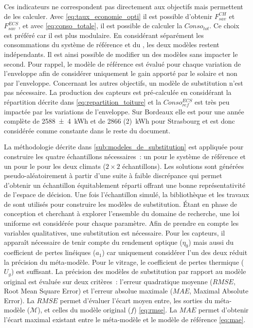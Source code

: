 Ces indicateurs ne correspondent pas directement aux objectifs mais permettent de les calculer.
Avec \eqref{eq:taux_economie_opti} il est possible d’obtenir $F_{sav}^{CH}$ et $F_{sav}^{ECS}$,
et avec \eqref{eq:conso_totale}, il est possible de calculer la $Conso_{tot}$.
Ce choix est préféré car il est plus modulaire. En considérant séparément les consommations
du système de référence et du , les deux modèles restent indépendants. Il est
ainsi possible de modifier un des modèles sans impacter le second. Pour rappel, le
modèle de référence est évalué pour chaque variation de l’enveloppe afin de considérer
uniquement le gain apporté par le solaire et non par l’enveloppe.
Concernant les autres objectifs, un modèle de substitution n’est pas nécessaire. La
production des capteurs  est pré-calculée en considérant la répartition décrite
dans \eqref{eq:repartition_toiture} et la $Conso_{ref}^{ECS}$ est très peu impactée par
les variations de l’enveloppe. Sur Bordeaux elle est pour une année complète de \SI{2588(4)}{kWh}
et de \SI{2866 (2)}{kWh} pour Strasbourg et est donc considérée comme constante
dans le reste du document.

La méthodologie décrite dans \ref{sub:modeles_de_substitution} est appliquée pour
construire les quatre échantillons nécessaires~: un pour le système de référence et un pour
le  pour les deux climats ($2 \times 2$ échantillons). Les solutions sont
générées pseudo-aléatoirement à partir d’une suite à faible discrépance qui permet
d’obtenir un échantillon équitablement réparti offrant une bonne représentativité de
l’espace de décision. Une fois l’échantillon simulé, la bibliothèque
 et les travaux de \textcite{Merheb2013}
sont utilisés pour construire les modèles de substitution. Étant en phase de conception
et cherchant à explorer l’ensemble du domaine de recherche, une loi uniforme est
considérée pour chaque paramètre. Afin de prendre en compte les variables qualitatives,
une substitution est nécessaire. Pour les capteurs, il apparaît nécessaire de tenir compte
du rendement optique ($\eta_{0}$) mais aussi du coefficient de pertes linéiques ($a_{1}$)
car uniquement considérer l’un des deux réduit la précision du méta-modèle. Pour le
vitrage, le coefficient de pertes thermique ($U_{g}$) est suffisant. La précision des
modèles de substitution par rapport au modèle original est évaluée sur deux critères~:
l’erreur quadratique moyenne ($RMSE$, Root Mean Square Error) et l’erreur absolue maximale
($MAE$, Maximal Absolute Error). La $RMSE$ permet d’évaluer l’écart moyen entre, les
sorties du méta-modèle ($\mathcal{M}$), et celles du modèle original ($f$)
\eqref{eq:rmse}. La $MAE$ permet d’obtenir l’écart maximal existant entre le méta-modèle
et le modèle de référence \eqref{eq:mae}.

